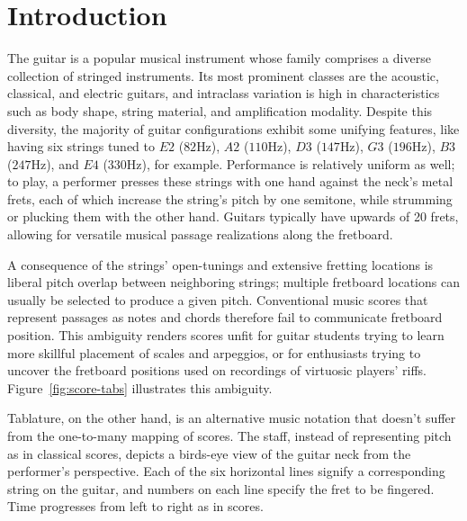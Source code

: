 \documentclass[12pt]{cmuthesis}
\begin{document}
\chapter{Introduction} 
The guitar is a popular musical instrument whose family comprises a diverse collection of stringed instruments. Its most prominent classes are the acoustic, classical, and electric guitars, and intraclass variation is high in characteristics such as body shape, string material, and amplification modality. Despite this diversity, the majority of guitar configurations exhibit some unifying features, like having six strings tuned to $E2$ ($82$Hz), $A2$ ($110$Hz), $D3$ ($147$Hz), $G3$ ($196$Hz), $B3$ ($247$Hz), and $E4$ ($330$Hz), for example. Performance is relatively uniform as well; to play, a performer presses these strings with one hand against the neck's metal frets, each of which increase the string's pitch by one semitone, while strumming or plucking them with the other hand. Guitars typically have upwards of 20 frets, allowing for versatile musical passage realizations along the fretboard.

A consequence of the strings' open-tunings and extensive fretting locations is liberal pitch overlap between neighboring strings; multiple fretboard locations can usually be selected to produce a given pitch. Conventional music scores that represent passages as notes and chords therefore fail to communicate fretboard position. This ambiguity renders scores unfit for guitar students trying to learn more skillful placement of scales and arpeggios, or for enthusiasts trying to uncover the fretboard positions used on recordings of virtuosic players' riffs. Figure~\ref{fig:score-tabs} illustrates this ambiguity.

Tablature, on the other hand, is an alternative music notation that doesn't suffer from the one-to-many mapping of scores. The staff, instead of representing pitch as in classical scores, depicts a birds-eye view of the guitar neck from the performer's perspective. Each of the six horizontal lines signify a corresponding string on the guitar, and numbers on each line specify the fret to be fingered. Time progresses from left to right as in scores. 
\end{document}
